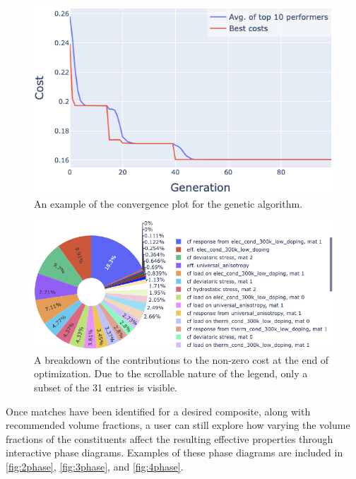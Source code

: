 \begin{figure}
\centering
\includegraphics[width=0.6\linewidth,height=\textheight,keepaspectratio]{figures/convg.png}
\caption{An example of the convergence plot for the genetic algorithm.
\label{fig:convg}}
\end{figure}

\begin{figure}
\centering
\includegraphics[width=0.9\linewidth,height=\textheight,keepaspectratio]{figures/cost-func-contribs.png}
\caption{A breakdown of the contributions to the non-zero cost at the
end of optimization. Due to the scrollable nature of the legend, only a
subset of the 31 entries is visible.\label{fig:cost-func-contribs}}
\end{figure}

Once matches have been identified for a desired composite, along with
recommended volume fractions, a user can still explore how varying the
volume fractions of the constituents affect the resulting effective
properties through interactive phase diagrams. Examples of these phase
diagrams are included in \autoref{fig:2phase}, \autoref{fig:3phase}, and
\autoref{fig:4phase}.

